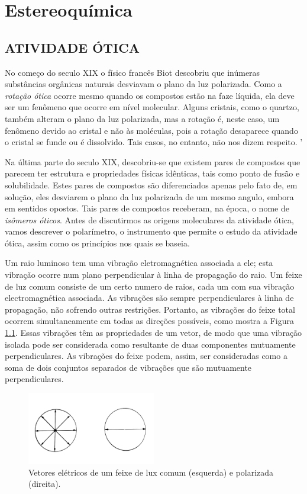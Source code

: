 \chapter{Estereoquímica}

\section{ATIVIDADE ÓTICA}

No começo do seculo XIX o físico francês Biot descobriu que inúmeras substâncias orgânicas naturais desviavam o plano da luz polarizada. Como a \textit{rotação ótica} ocorre mesmo quando os compostos estão na faze líquida, ela deve ser um fenômeno que ocorre em nível molecular. Alguns cristais, como o quartzo, também alteram o plano da luz polarizada, mas a rotação é, neste caso, um fenômeno devido ao cristal e não às moléculas, pois a rotação desaparece quando o cristal se funde ou é dissolvido. Tais casos, no entanto, não nos dizem respeito. '

Na última parte do seculo XIX, descobriu-se que existem pares de compostos que parecem ter estrutura e propriedades físicas idênticas, tais como ponto de fusão e solubilidade. Estes pares de compostos são diferenciados apenas pelo fato de, em solução, eles desviarem o plano da luz polarizada de um mesmo angulo, embora em sentidos opostos. Tais pares de compostos receberam, na época, o nome de \textit{isômeros óticos}. Antes de discutirmos as origens moleculares da atividade ótica, vamos descrever o polarímetro, o instrumento que permite o estudo da atividade ótica, assim como os princípios nos quais se baseia.

Um raio luminoso tem uma vibração eletromagnética associada a ele; esta vibração ocorre num plano perpendicular à linha de propagação do raio. Um feixe de luz comum consiste de um certo numero de raios, cada um com sua vibração electromagnética associada. As vibrações são sempre perpendiculares à linha de propagação, não sofrendo outras restrições. Portanto, as vibrações do feixe total ocorrem simultaneamente em todas as direções possíveis, como mostra a Figura \ref{figura_6_1}. Essas vibrações têm as propriedades de um vetor, de modo que uma vibração isolada pode ser considerada como resultante de duas componentes mutuamente perpendiculares. As vibrações do feixe podem, assim, ser consideradas como a soma de dois conjuntos separados de vibrações que são mutuamente perpendiculares.

\begin{figure}
    \centering
    \includegraphics[width=0.5\textwidth,angle=0]{content/images/Figura_6_1.pdf}
    \caption{Vetores elétricos de um feixe de lux comum (esquerda) e polarizada (direita).}
    \label{figura_6_1}
\end{figure}

